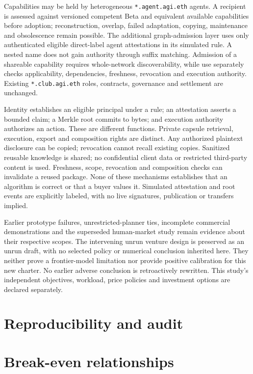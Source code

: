 \documentclass[11pt,a4paper]{article}
\begin{document}
Capabilities may be held by heterogeneous \texttt{*.agent.agi.eth} agents. A recipient is assessed against versioned competent Beta and equivalent available capabilities before adoption; reconstruction, overlap, failed adaptation, copying, maintenance and obsolescence remain possible. The additional graph-admission layer uses only authenticated eligible direct-label agent attestations in its simulated rule. A nested name does not gain authority through suffix matching. Admission of a shareable capability requires whole-network discoverability, while use separately checks applicability, dependencies, freshness, revocation and execution authority. Existing \texttt{*.club.agi.eth} roles, contracts, governance and settlement are unchanged.\cite{Merkle,ProofLoops}

Identity establishes an eligible principal under a rule; an attestation asserts a bounded claim; a Merkle root commits to bytes; and execution authority authorizes an action. These are different functions. Private capsule retrieval, execution, export and composition rights are distinct. Any authorized plaintext disclosure can be copied; revocation cannot recall existing copies. Sanitized reusable knowledge is shared; no confidential client data or restricted third-party content is used. Freshness, scope, revocation and composition checks can invalidate a reused package. None of these mechanisms establishes that an algorithm is correct or that a buyer values it. Simulated attestation and root events are explicitly labeled, with no live signatures, publication or transfers implied.

Earlier prototype failures, unrestricted-planner ties, incomplete commercial demonstrations and the superseded human-market study remain evidence about their respective scopes. The intervening unrun venture design is preserved as an unrun draft, with no selected policy or numerical conclusion inherited here. They neither prove a frontier-model limitation nor provide positive calibration for this new charter. No earlier adverse conclusion is retroactively rewritten. This study's independent objectives, workload, price policies and investment options are declared separately.

\section{Reproducibility and audit}
\ResultAudit


\section{Break-even relationships}
\end{document}
